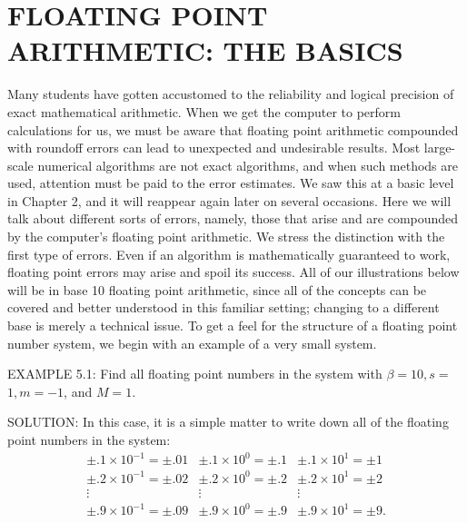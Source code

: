 \documentclass[../main.tex]{subfiles}
\begin{document}
\section{ FLOATING POINT ARITHMETIC: THE BASICS}

Many students have gotten accustomed to the reliability and logical precision of exact mathematical arithmetic. When we get the computer to perform calculations for us, we must be aware that floating point arithmetic compounded with roundoff errors can lead to unexpected and undesirable results. Most large-scale numerical algorithms are not exact algorithms, and when such methods are used, attention must be paid to the error estimates. We saw this at a basic level in Chapter 2, and it will reappear again later on several occasions. Here we will talk about different sorts of errors, namely, those that arise and are compounded by the computer's floating point arithmetic. We stress the distinction with the first type of errors. Even if an algorithm is mathematically guaranteed to work, floating point errors may arise and spoil its success. All of our illustrations below will be in base 10 floating point arithmetic, since all of the concepts can be covered and better understood in this familiar setting; changing to a different base is merely a technical issue. To get a feel for the structure of a floating point number system, we begin with an example of a very small system.

EXAMPLE 5.1: Find all floating point numbers in the system with $\beta=10, s=$ $1, m=-1$, and $M=1$.

SOLUTION: In this case, it is a simple matter to write down all of the floating point numbers in the system:
$$
\begin{array}{ccc}
\pm .1 \times 10^{-1}=\pm .01 & \pm .1 \times 10^{0}=\pm .1 & \pm .1 \times 10^{1}=\pm 1 \\
\pm .2 \times 10^{-1}=\pm .02 & \pm .2 \times 10^{0}=\pm .2 & \pm .2 \times 10^{1}=\pm 2 \\
\vdots & \vdots & \vdots \\
\pm .9 \times 10^{-1}=\pm .09 & \pm .9 \times 10^{0}=\pm .9 & \pm .9 \times 10^{1}=\pm 9 .
\end{array}
$$
\end{document}
